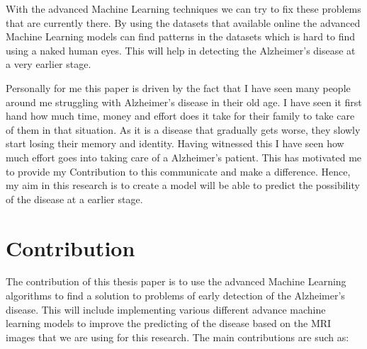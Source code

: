 \documentclass[10pt,twocolumn]{report}
\begin{document}
With the advanced Machine Learning techniques we can try to fix these problems that are currently there. By using the datasets that available online the advanced Machine Learning models can find patterns in the datasets which is hard to find using a naked human eyes. This will help in detecting the  Alzheimer's disease at a very earlier stage. 

Personally for me this paper is driven by the fact that I have seen many people around me struggling with Alzheimer's disease in their old age. I have seen it first hand how much time, money and effort does it take for their family to take care of them in that situation. As it is a disease that gradually gets worse, they slowly start losing their memory and identity. Having witnessed this I have seen how much effort goes into taking care of a Alzheimer's patient. This has motivated me to provide my Contribution to this communicate and make a difference. Hence, my aim in this research is to create a model will be able to predict the possibility of the disease at a earlier stage. 


\chapter{Contribution}

The contribution of this thesis paper is to use the advanced Machine Learning algorithms to find a solution to problems of early detection of the Alzheimer's disease. This will include implementing various different advance machine learning models to improve the predicting of the disease based on the MRI images that we are using for this research. The main contributions are such as:
\end{document}
